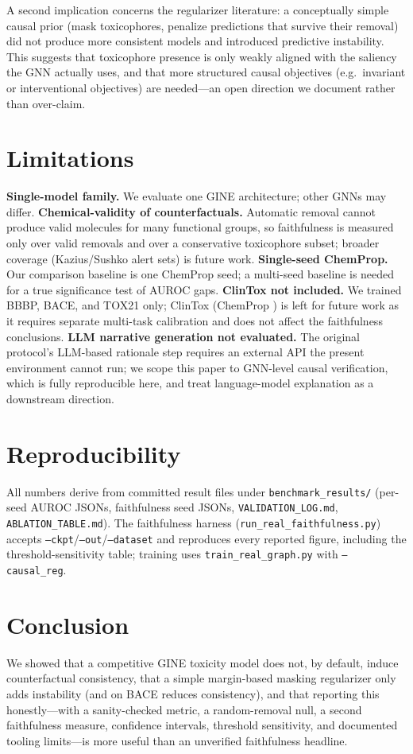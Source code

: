 \documentclass[journal]{IEEEtran}
\begin{document}
A second implication concerns the regularizer literature: a conceptually simple
causal prior (mask toxicophores, penalize predictions that survive their removal)
did not produce more consistent models and introduced predictive instability. This
suggests that toxicophore presence is only weakly aligned with the saliency the
GNN actually uses, and that more structured causal objectives (e.g.\ invariant or
interventional objectives) are needed---an open direction we document rather than
over-claim.

\section{Limitations}
\textbf{Single-model family.} We evaluate one GINE architecture; other GNNs may
differ. \textbf{Chemical-validity of counterfactuals.} Automatic removal cannot
produce valid molecules for many functional groups, so faithfulness is measured
only over valid removals and over a conservative toxicophore subset; broader
coverage (Kazius/Sushko alert sets) is future work. \textbf{Single-seed
ChemProp.} Our comparison baseline is one ChemProp seed; a multi-seed baseline is
needed for a true significance test of AUROC gaps. \textbf{ClinTox not included.}
We trained BBBP, BACE, and TOX21 only; ClinTox (ChemProp \ChemClin) is left for
future work as it requires separate multi-task calibration and does not affect the
faithfulness conclusions. \textbf{LLM narrative generation not evaluated.} The
original protocol's LLM-based rationale step requires an external API the present
environment cannot run; we scope this paper to GNN-level causal verification, which
is fully reproducible here, and treat language-model explanation as a downstream
direction.

\section{Reproducibility}
All numbers derive from committed result files under
\texttt{benchmark\_results/} (per-seed AUROC JSONs, faithfulness seed JSONs,
\texttt{VALIDATION\_LOG.md}, \texttt{ABLATION\_TABLE.md}). The faithfulness
harness (\texttt{run\_real\_faithfulness.py}) accepts
\texttt{--ckpt}/\texttt{--out}/\texttt{--dataset} and reproduces every reported
figure, including the threshold-sensitivity table; training uses
\texttt{train\_real\_graph.py} with \texttt{--causal\_reg}.

\section{Conclusion}
We showed that a competitive GINE toxicity model does not, by default, induce
counterfactual consistency, that a simple margin-based masking regularizer only
adds instability (and on BACE reduces consistency), and that reporting this
honestly---with a sanity-checked metric, a random-removal null, a second
faithfulness measure, confidence intervals, threshold sensitivity, and documented
tooling limits---is more useful than an unverified faithfulness headline.



\end{document}
